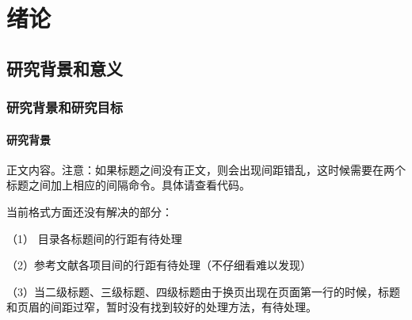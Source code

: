 
\chapter{绪论}
\label{章：绪论}

\vspace{\gapcheptersection}

  \section{研究背景和意义}\label{节：研究背景和意义}

  \vspace{\gapsectionsub}

    \subsection{研究背景和研究目标}\label{小节：研究背景和研究目标} 

    \vspace{\gapsubsectionsubsub}

      \subsubsection{研究背景}

正文内容。注意：如果标题之间没有正文，则会出现间距错乱，这时候需要在两个标题之间加上相应的间隔命令。具体请查看代码。

当前格式方面还没有解决的部分：

（1） 目录各标题间的行距有待处理

（2）参考文献各项目间的行距有待处理（不仔细看难以发现）

（3）当二级标题、三级标题、四级标题由于换页出现在页面第一行的时候，标题和页眉的间距过窄，暂时没有找到较好的处理方法，有待处理。

   